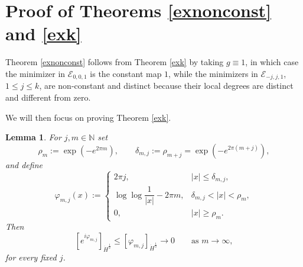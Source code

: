 \documentclass[12pt, a4paper]{article}
\newtheorem{lem}[thm]{Lemma}
\renewcommand{\(}{\left(}
\renewcommand{\)}{\right)}
\begin{document}
\section{Proof of Theorems \ref{exnonconst} and \ref{exk}}

Theorem \ref{exnonconst} follows from Theorem \ref{exk} by taking $g\equiv 1$, in which case the minimizer in $\mathcal E_{0,0,1}$ is the constant map $1$, while the minimizers in $\mathcal E_{-j,j,1}$, $1\le j\le k$, are non-constant and distinct because their local degrees are distinct and different from zero.

We will then focus on proving Theorem \ref{exk}.

\begin{lem}\label{lem:loglog-transition}
For $j,m\in \mathbb N$  set
\[
\rho_m:=\exp(-e^{2\pi m}),\qquad
\delta_{m,j}:=\rho_{m+j}=\exp(-e^{2\pi(m+j)}),
\]
and define
\[
\varphi_{m,j}(x):=
\begin{cases}
2\pi j,& |x|\le \delta_{m,j},\\[2mm]
\log\log\dfrac1{|x|} - 2\pi m,& \delta_{m,j}<|x|<\rho_m,\\[2mm]
0,& |x|\ge \rho_m.
\end{cases}
\]
Then
\[
[e^{i\varphi_{m,j}}]_{\dot H^{\frac12}}\le [\varphi_{m,j}]_{\dot H^{\frac12}}\longrightarrow0
\qquad\text{as }m\to\infty,
\]
for every fixed $j$.
\end{lem}
\end{document}
